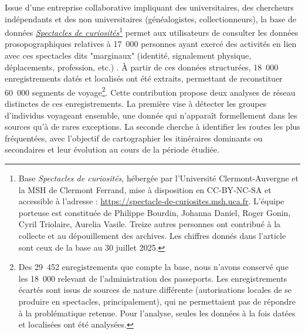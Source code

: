 \documentclass[final, fra]{anthology-ch}     %
\begin{document}
Issue d'une entreprise collaborative impliquant des universitaires, des chercheurs indépendants et des non universitaires (généalogistes, collectionneurs), la base de données \href{https://spectacle-de-curiosites.msh.uca.fr}{\textit{Spectacles de curiosités}}\footnote{Base \textit{Spectacles de curiosités}, hébergée par l'Université Clermont-Auvergne et la MSH de Clermont Ferrand, mise à disposition en CC-BY-NC-SA et accessible à l'adresse : \href{https://spectacle-de-curiosites.msh.uca.fr/}{https://spectacle-de-curiosites.msh.uca.fr}. L'équipe porteuse est constituée de Philippe Bourdin, Johanna Daniel, Roger Gonin, Cyril Triolaire, Aurelia Vasile. Treize autres personnes ont contribué à la collecte et au dépouillement des archives. Les chiffres donnés dans l'article sont ceux de la base au 30 juillet 2025.} permet aux utilisateurs de consulter les données prosopographiques relatives à 17 000 personnes ayant exercé des activités en lien avec ces spectacles dits "marginaux" (identité, signalement physique, déplacements, profession, etc.) \cite{bourdin_spectacles_2024}. À partir de ces données structurées, 18 000 enregistrements datés et localisés ont été extraits, permettant de reconstituer 60 000 segments de voyage\footnote{Des 29 452 enregistrements que compte la base, nous n'avons conservé que les 18 000 relevant de l'administration des passeports. Les enregistrements écartés sont issus de sources de nature différente (autorisations locales de se produire en spectacles, principalement), qui ne permettaient pas de répondre à la problématique retenue. Pour l'analyse, seules les données à la fois datées et localisées ont été analysées.}. Cette contribution propose deux analyses de réseau distinctes de ces enregistrements. La première vise à détecter les groupes d'individus voyageant ensemble, une donnée qui n'apparaît formellement dans les sources qu'à de rares exceptions. La seconde cherche à identifier les routes les plus fréquentées, avec l'objectif de cartographier les itinéraires dominants ou secondaires et leur évolution au cours de la période étudiée.   
\end{document}

